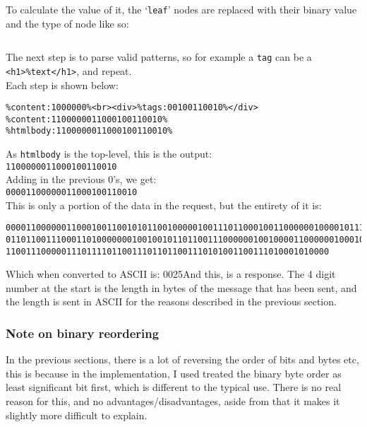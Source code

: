 To calculate the value of it, the `\texttt{leaf}' nodes are replaced with their binary value and the type of node like so:
\begin{lstlisting}[numbers=none]
%content:0%<br><h1>%text:00%</h1><br><div><span><span><h2>%text:10%<h2></span></span></div>
\end{lstlisting}
The next step is to parse valid patterns, so for example a \texttt{tag} can be a \texttt{<h1>\%text</h1>}, and repeat.\\
Each step is shown below:
\begin{lstlisting}[numbers=none]
%content:1000000%<br><div><span>%tags:00110010%</span></div>
%content:1000000%<br><div>%tags:00100110010%</div>
%content:1100000011000100110010%
%htmlbody:1100000011000100110010%
\end{lstlisting}
As \texttt{htmlbody} is the top-level, this is the output:\\
\texttt{1100000011000100110010}\\
Adding in the previous 0's, we get:\\
\texttt{00001100000011000100110010}\\
This is only a portion of the data in the request, but the entirety of it is:
\begin{lstlisting}[numbers=none,breaklines=true,breakatwhitespace=false]
000011000000110001001100101011001000001001110110001001100000010000101110000101101001
011011001110001101000000010010010110110011100000010010000110000001000100111010100110
1100111000001110111101100111011011001110101001100111010001010000
\end{lstlisting}
Which when converted to ASCII is:
0025And this, is a response.
The 4 digit number at the start is the length in bytes of the message that has been sent, and the length is sent in ASCII for the reasons described in the previous section.

\subsubsection{Note on binary reordering}
In the previous sections, there is a lot of reversing the order of bits and bytes etc, this is because in the implementation, I used treated the binary byte order as least significant bit first, which is different to the typical use. There is no real reason for this, and no advantages/disadvantages, aside from that it makes it slightly more difficult to explain. 

